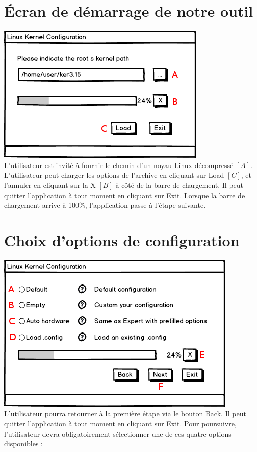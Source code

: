 \documentclass[16pts]{report}
\begin{document}
\section{Écran de démarrage de notre outil}
\label{sec:Écran de démarrage de notre outil}
\includegraphics[scale=0.7]{illustrations/first_dialog_an.png} \\

L'utilisateur est invité à fournir le chemin d'un noyau Linux décompressé $[A]$.
L'utilisateur peut charger les options de l'archive en cliquant sur Load $[C]$,
et l'annuler en cliquant sur la X $[B]$ à côté de la barre de chargement.
Il peut quitter l'application à tout moment en cliquant sur Exit.
Lorsque la barre de chargement arrive à 100\%, l'application passe à l'étape
suivante.


\section{Choix d'options de configuration}
\label{sec:Choix d'options de configuration}
\includegraphics[scale=0.7]{illustrations/choose_dialog_an.png} \\

L'utilisateur pourra retourner à la première étape via le bouton Back.
Il peut quitter l'application à tout moment en cliquant sur Exit.
Pour poursuivre, l'utilisateur devra obligatoirement sélectionner une de ces
quatre options disponibles :
\end{document}
